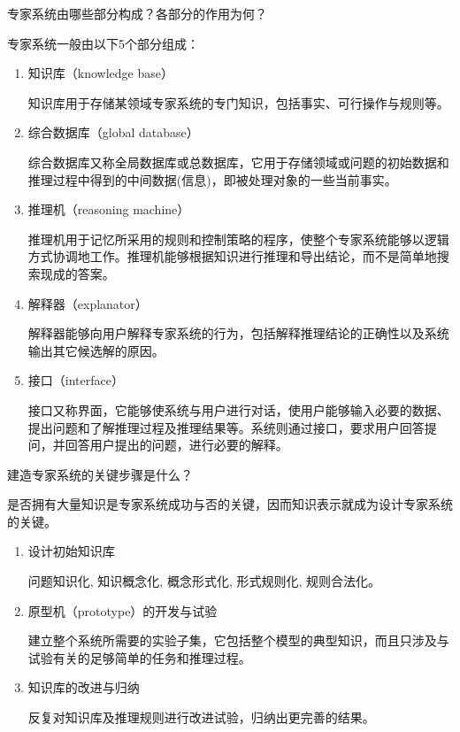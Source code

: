 \begin{question}
专家系统由哪些部分构成？各部分的作用为何？
\end{question}
\begin{solution}
专家系统一般由以下5个部分组成：
	\begin{enumerate}
		\item 知识库（knowledge base）\par
		知识库用于存储某领域专家系统的专门知识，包括事实、可行操作与规则等。 
		\item 综合数据库（global database）\par
		综合数据库又称全局数据库或总数据库，它用于存储领域或问题的初始数据和推理过程中得到的中间数据(信息)，即被处理对象的一些当前事实。  
		\item 推理机（reasoning machine）\par
		推理机用于记忆所采用的规则和控制策略的程序，使整个专家系统能够以逻辑方式协调地工作。推理机能够根据知识进行推理和导出结论，而不是简单地搜索现成的答案。
		\item 解释器（explanator）\par
		解释器能够向用户解释专家系统的行为，包括解释推理结论的正确性以及系统输出其它候选解的原因。 
		\item 接口（interface）\par
		接口又称界面，它能够使系统与用户进行对话，使用户能够输入必要的数据、提出问题和了解推理过程及推理结果等。系统则通过接口，要求用户回答提问，并回答用户提出的问题，进行必要的解释。
	
	\end{enumerate}
\end{solution}

\begin{question}
建造专家系统的关键步骤是什么？
\end{question}
\begin{solution}
是否拥有大量知识是专家系统成功与否的关键，因而知识表示就成为设计专家系统的关键。
	\begin{enumerate}
		\item 设计初始知识库 \par
		问题知识化, 知识概念化, 概念形式化, 形式规则化, 规则合法化。
		\item 原型机（prototype）的开发与试验 \par
		建立整个系统所需要的实验子集，它包括整个模型的典型知识，而且只涉及与试验有关的足够简单的任务和推理过程。
		\item 知识库的改进与归纳 \par
		反复对知识库及推理规则进行改进试验，归纳出更完善的结果。
	\end{enumerate}
\end{solution}

